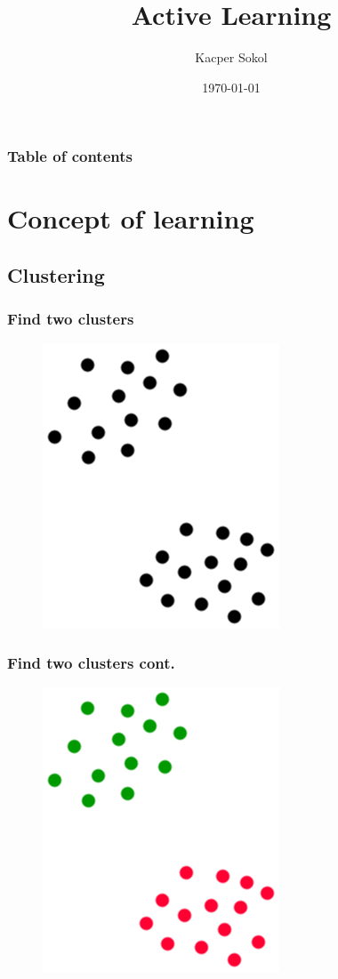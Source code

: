\documentclass{beamer}
\begin{document}
\title{Active Learning}  
\author{Kacper Sokol}
\date{\today} 
\begin{frame}
\titlepage
\end{frame}




\begin{frame}
  \frametitle{Table of contents}
  \tableofcontents
\end{frame} 


\section{Concept of learning} 
  \subsection{Clustering}
  \begin{frame}%
    \frametitle{Find two clusters} 
    \begin{figure}
      \includegraphics[scale=.5]{graphics/presentation/clusters1} 
    \end{figure}
  \end{frame}

  \begin{frame}%
    \frametitle{Find two clusters cont.} 
    \begin{figure}
      \includegraphics[scale=.5]{graphics/presentation/clusters1a} 
    \end{figure}
  \end{frame}
\end{document}
